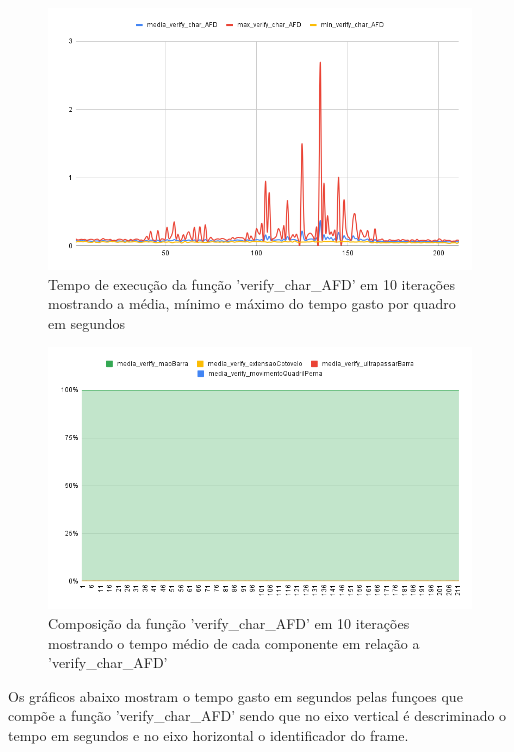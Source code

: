 \begin{figure}[!htb]
	\centering
	\includegraphics[scale=0.55]{figuras/grafico/char_AFD.png}
	\caption{Tempo de execução da função 'verify\_char\_AFD' em 10 iterações mostrando a média, mínimo e máximo do tempo gasto por quadro em segundos}
\end{figure}

\begin{figure}[!htb]
	\centering
	\includegraphics[scale=0.55]{figuras/grafico/comp_char_AFD.png}
	\caption{Composição da função 'verify\_char\_AFD' em 10 iterações mostrando o tempo médio de cada componente em relação a  'verify\_char\_AFD' }
\end{figure}

\newpage

Os gráficos abaixo mostram o tempo gasto em segundos pelas funçoes que compõe a função 'verify\_char\_AFD' sendo que no eixo vertical é descriminado o tempo em segundos e no eixo 
 horizontal o identificador do frame.

